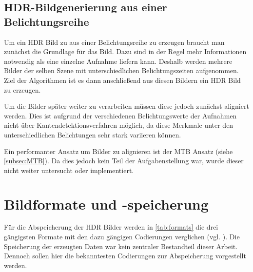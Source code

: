 \subsection{HDR-Bildgenerierung aus einer Belichtungsreihe}
\label{sub:belichtungsreihe}
Um ein \gls{HDR} Bild zu aus einer Belichtungsreihe zu erzeugen braucht man zunächst die Grundlage für das Bild. Dazu sind in der Regel mehr Informationen notwendig als eine einzelne Aufnahme liefern kann. Deshalb werden mehrere Bilder der selben Szene mit unterschiedlichen Belichtungszeiten aufgenommen. Ziel der Algorithmen ist es dann anschließend aus diesen Bildern ein \gls{HDR} Bild zu erzeugen.

Um die Bilder später weiter zu verarbeiten müssen diese jedoch zunächst aligniert werden. Dies ist aufgrund der verschiedenen Belichtungswerte der Aufnahmen nicht über Kantendetektionsverfahren möglich, da diese Merkmale unter den unterschiedlichen Belichtungen sehr stark variieren können.

Ein performanter Ansatz um Bilder zu alignieren ist der \gls{MTB} Ansatz (siehe \autoref{subsec:MTB}). Da dies jedoch kein Teil der Aufgabenstellung war, wurde dieser nicht weiter untersucht oder implementiert. 

\section{Bildformate und -speicherung}

Für die Abspeicherung der \gls{HDR} Bilder werden in \autoref{tab:formats} die drei gängigsten Formate mit den dazu gängigen Codierungen verglichen (vgl. \cite{Reinhard}). Die Speicherung der erzeugten Daten war kein zentraler Bestandteil dieser Arbeit. Dennoch sollen hier die bekanntesten Codierungen zur Abspeicherung vorgestellt werden.

